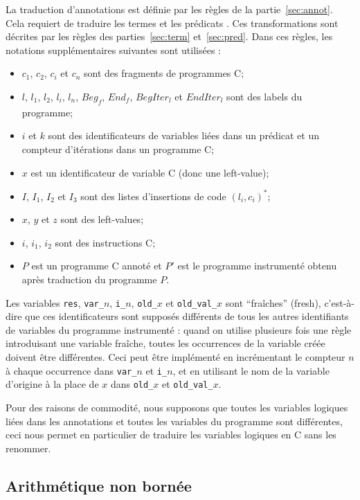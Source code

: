 La traduction d'annotations est définie par les règles de la
partie~\ref{sec:annot}.
Cela requiert de traduire les termes et les prédicats \eacsl.
Ces transformations sont décrites par les règles des parties~\ref{sec:term}
et~\ref{sec:pred}.
Dans ces règles, les notations supplémentaires suivantes sont utilisées :
\begin{itemize}
\item $c_1$, $c_2$, $c_i$ et $c_n$ sont des fragments de programmes C;
\item $l$, $l_1$, $l_2$, $l_i$, $l_n$, $\mathit{Beg_f}$, $\mathit{End_f}$,
  $\mathit{BegIter_l}$ et $\mathit{EndIter_l}$ sont des labels du programme;
\item $i$ et $k$ sont des identificateurs de variables liées
  dans un prédicat \eacsl et un compteur d'itérations dans un programme C;
\item $x$ est un identificateur de variable C (donc une left-value);
\item $I$, $I_1$, $I_2$ et $I_3$ sont des listes d'insertions de code
  $(l_i, c_i)^*$;
\item $x$, $y$ et $z$ sont des left-values;
\item $i$, $i_1$, $i_2$ sont des instructions C;
\item $P$ est un programme C annoté et $P'$ est le programme instrumenté
  obtenu après traduction du programme $P$.
\end{itemize}

Les variables \lstinline'res', \lstinline'var_'$n$, \lstinline'i_'$n$,
\lstinline'old_'$x$ et \lstinline'old_val_'$x$ sont
``fraîches'' (fresh), c'est-à-dire que ces identificateurs sont supposés
différents de tous les autres identifiants de variables du programme instrumenté
: quand on utilise plusieurs fois une règle introduisant une variable fraîche,
toutes les occurrences de la variable créée doivent être différentes.
Ceci peut être implémenté en incrémentant le compteur $n$ à chaque
occurrence dans \lstinline'var_'$n$ et \lstinline'i_'$n$, et en utilisant le nom
de la variable d'origine à la place de $x$ dans \lstinline'old_'$x$ et
\lstinline'old_val_'$x$.

Pour des raisons de commodité, nous supposons que toutes les variables logiques
liées dans les annotations et toutes les variables du programme sont
différentes, ceci nous permet en particulier de traduire les variables logiques
en C sans les renommer.


\subsection{Arithmétique non bornée}
\label{sec:integers}


